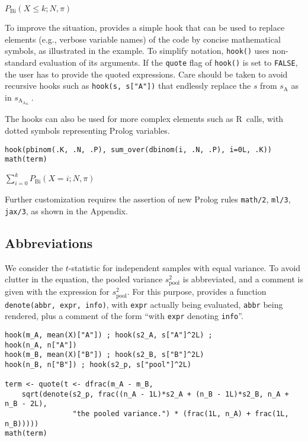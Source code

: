 \({P}_{\mathrm{Bi}}{\left({{X}{\le}{k}}{{;}{{N}{{,}{\pi}}}}\right)}\)

To improve the situation,  provides a simple hook that can be used
to replace elements (e.g., verbose variable names) of the code by concise
mathematical symbols, as illustrated in the example. To simplify notation,
\texttt{hook()} uses non-standard evaluation of its arguments. If the \texttt{quote} flag
of \texttt{hook()} is set to \texttt{FALSE}, the user has to provide the quoted expressions.
Care should be taken to avoid recursive hooks such as \texttt{hook(s,\ s{[}"A"{]})} that
endlessly replace the \(s\) from \(s_{\mathrm{A}}\) as
in \(s_{\mathrm{A}_{\mathrm{A}_{\mathrm{A}\cdots}}}\).

The hooks can also be used for more complex elements such as R~calls, with
dotted symbols representing Prolog variables.

\begin{verbatim}
hook(pbinom(.K, .N, .P), sum_over(dbinom(i, .N, .P), i=0L, .K))
math(term)
\end{verbatim}

\({\sum}_{{i}{=}{0}}^{k}{{P}_{\mathrm{Bi}}{\left({{X}{=}{i}}{{;}{{N}{{,}{\pi}}}}\right)}}\)

Further customization requires the assertion of new Prolog rules \texttt{math/2},
\texttt{ml/3}, \texttt{jax/3}, as shown in the Appendix.

\hypertarget{abbreviations}{%
\subsection{Abbreviations}\label{abbreviations}}

We consider the \(t\)-statistic for independent samples with equal variance. To
avoid clutter in the equation, the pooled variance \(s^2_{\mathrm{pool}}\) is
abbreviated, and a comment is given with the expression
for \(s^2_{\mathrm{pool}}\). For this purpose,  provides a
function \texttt{denote(abbr,\ expr,\ info)}, with \texttt{expr} actually being
evaluated, \texttt{abbr} being rendered, plus a comment of the
form ``with \texttt{expr} denoting \texttt{info}''.

\begin{verbatim}
hook(m_A, mean(X)["A"]) ; hook(s2_A, s["A"]^2L) ;
hook(n_A, n["A"])
hook(m_B, mean(X)["B"]) ; hook(s2_B, s["B"]^2L)
hook(n_B, n["B"]) ; hook(s2_p, s["pool"]^2L)

term <- quote(t <- dfrac(m_A - m_B, 
    sqrt(denote(s2_p, frac((n_A - 1L)*s2_A + (n_B - 1L)*s2_B, n_A + n_B - 2L),
                "the pooled variance.") * (frac(1L, n_A) + frac(1L, n_B)))))
math(term)
\end{verbatim}

